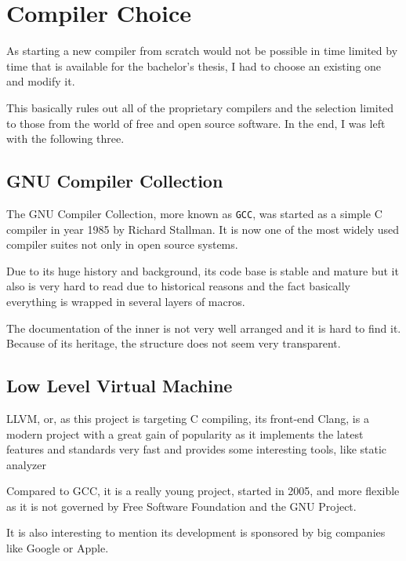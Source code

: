 \chapter{Compiler Choice}\label{compiler}

As starting a new compiler from scratch would not be possible in time limited by time that is available for the bachelor's thesis, I had to choose an existing one and modify it.

This basically rules out all of the proprietary compilers and the selection limited to those from the world of free and open source software. In the end, I was left with the following three.


    \section{GNU Compiler Collection}

    The GNU Compiler Collection, more known as \texttt{GCC}, was started as a simple C compiler in year 1985 by Richard Stallman. It is now one of the most widely used compiler suites not only in open source systems.

    Due to its huge history and background, its code base is stable and mature but it also is very hard to read due to historical reasons and the fact basically everything is wrapped in several layers of macros.

    The documentation of the inner %
    is not very well arranged and it is hard to find it. Because of its heritage, the structure does not seem very transparent.

    \section{Low Level Virtual Machine}

    LLVM, or, as this project is targeting C compiling, its front-end Clang, is a modern project with a great gain of popularity as it implements the latest features and standards very fast and provides some interesting tools, like static analyzer

    Compared to GCC, it is a really young project, started in 2005, and more flexible as it is not governed by Free Software Foundation and the GNU Project.

    It is also interesting to mention its development is sponsored by big companies like Google or Apple.

